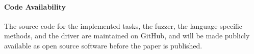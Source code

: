 \documentclass[10pt]{sigplanconf}
\begin{document}
\paragraph{Code Availability} The source code for
the implemented tasks,
the fuzzer,
the language-specific methods, and
the driver are maintained on GitHub, and
will be made publicly available as open source software
before the paper is published.








\end{document}

